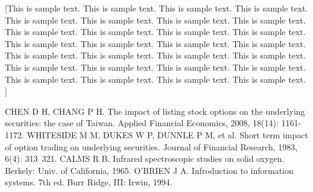 \documentclass[a4paper,11pt,onecolumn,twoside]{article}
\begin{document}
[This is sample text. This is sample text. This is sample text. This is sample text. This is sample text. This is sample text. This is sample text. This is sample text. This is sample text. This is sample text. This is sample text. This is sample text. This is sample text. This is sample text. This is sample text. This is sample text. This is sample text. This is sample text. This is sample text. This is sample text. This is sample text. This is sample text. This is sample text. This is sample text. This is sample text. This is sample text. This is sample text. This is sample text. ]
					
\small
\begin{thebibliography}{99}
\setlength{\parskip}{0pt}
 CHEN D H, CHANG P H. The impact of listing stock options on the underlying securities: the case of Taiwan. Applied Financial Economics, 2008, 18(14): 1161-1172. %
 WHITESIDE M M, DUKES W P, DUNNLE P M, et al. Short term impact of option trading on underlying securities. Journal of Financial Research, 1983, 6(4): 313~321.
 CALMS R B. Infrared spectroscopic studies on solid oxygen. Berkely: Univ. of California, 1965. %
 O'BRIEN J A. Infroduction to information systems. 7th ed. Burr Ridge, III: Irwin, 1994. %
\end{thebibliography}
\normalsize
\newpage
\end{document}
